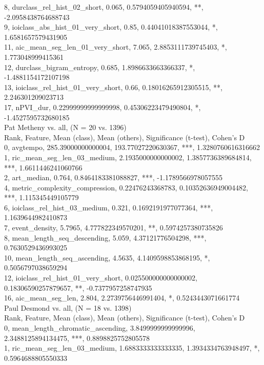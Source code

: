 8, durclass_rel_hist_02_short, 0.065, 0.5794059405940594, **, -2.0958438764688743\\
9, ioiclass_abs_hist_01_very_short, 0.85, 0.44041018387553044, *, 1.6581657579431905\\
11, aic_mean_seg_len_01_very_short, 7.065, 2.8853111739745403, *, 1.773048999415361\\
12, durclass_bigram_entropy, 0.685, 1.8986633663366337, *, -1.4881154172107198\\
13, ioiclass_rel_hist_01_very_short, 0.66, 0.18016265912305515, **, 2.246301209023713\\
17, nPVI_dur, 0.22999999999999998, 0.45306223479490804, *, -1.4527595732680185\\
Pat Metheny vs. all, (N = 20 vs. 1396)\\
Rank, Feature, Mean (class), Mean (others), Significance (t-test), Cohen's D\\
0, avgtempo, 285.39000000000004, 193.77027220630367, ***, 1.3280760616316662\\
1, ric_mean_seg_len_03_medium, 2.1935000000000002, 1.3857736389684814, ***, 1.6611446241060766\\
2, art_median, 0.764, 0.8464183381088827, ***, -1.1789566978057555\\
4, metric_complexity_compression, 0.22476243368783, 0.10352636949004482, ***, 1.115345449105779\\
6, ioiclass_rel_hist_03_medium, 0.321, 0.1692191977077364, ***, 1.1639644982410873\\
7, event_density, 5.7965, 4.777822349570201, **, 0.5974257380735826\\
8, mean_length_seq_descending, 5.059, 4.37121776504298, ***, 0.7630529436993025\\
10, mean_length_seq_ascending, 4.5635, 4.1409598853868195, *, 0.5056797038659294\\
12, ioiclass_rel_hist_01_very_short, 0.025500000000000002, 0.18306590257879657, **, -0.7377957258747935\\
16, aic_mean_seg_len, 2.804, 2.2739756446991404, *, 0.5243443071661774\\
Paul Desmond vs. all, (N = 18 vs. 1398)\\
Rank, Feature, Mean (class), Mean (others), Significance (t-test), Cohen's D\\
0, mean_length_chromatic_ascending, 3.8499999999999996, 2.3488125894134475, ***, 0.8898825752805578\\
1, ric_mean_seg_len_03_medium, 1.6883333333333335, 1.3934334763948497, *, 0.5964688805550333\\

